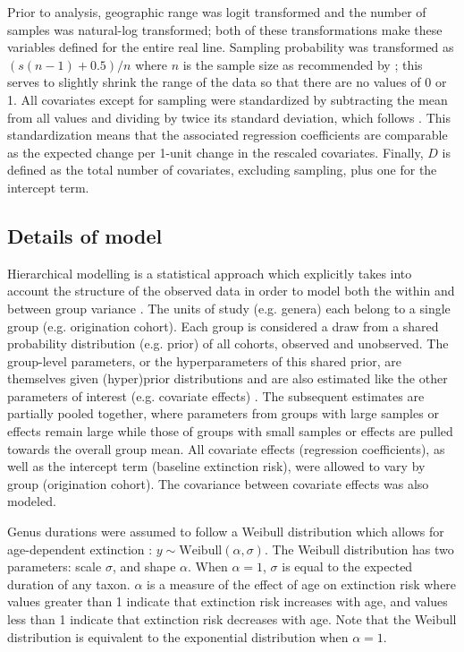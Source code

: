 \documentclass[11pt]{article}
\begin{document}
Prior to analysis, geographic range was logit transformed and the number of samples was natural-log transformed; both of these transformations make these variables defined for the entire real line. Sampling probability was transformed as \((s (n - 1) + 0.5) / n\) where \(n\) is the sample size as recommended by \citet{Smithson2006}; this serves to slightly shrink the range of the data so that there are no values of 0 or 1. All covariates except for sampling were standardized by subtracting the mean from all values and dividing by twice its standard deviation, which follows \citet{Gelman2007}. This standardization means that the associated regression coefficients are comparable as the expected change per 1-unit change in the rescaled covariates. Finally, \(D\) is defined as the total number of covariates, excluding sampling, plus one for the intercept term.



\subsection*{Details of model}

Hierarchical modelling is a statistical approach which explicitly takes into account the structure of the observed data in order to model both the within and between group variance \citep{Gelman2013d,Gelman2007}. The units of study (e.g. genera) each belong to a single group (e.g. origination cohort). Each group is considered a draw from a shared probability distribution (e.g. prior) of all cohorts, observed and unobserved. The group-level parameters, or the hyperparameters of this shared prior, are themselves given (hyper)prior distributions and are also estimated like the other parameters of interest (e.g. covariate effects) \citep{Gelman2013d}. The subsequent estimates are partially pooled together, where parameters from groups with large samples or effects remain large while those of groups with small samples or effects are pulled towards the overall group mean. All covariate effects (regression coefficients), as well as the intercept term (baseline extinction risk), were allowed to vary by group (origination cohort). The covariance between covariate effects was also modeled. 

Genus durations were assumed to follow a Weibull distribution which allows for age-dependent extinction \citep{Klein2003}: \(y \sim \mathrm{Weibull}(\alpha, \sigma)\). The Weibull distribution has two parameters: scale \(\sigma\), and shape \(\alpha\). When \(\alpha = 1\), \(\sigma\) is equal to the expected duration of any taxon. \(\alpha\) is a measure of the effect of age on extinction risk where values greater than 1 indicate that extinction risk increases with age, and values less than 1 indicate that extinction risk decreases with age. Note that the Weibull distribution is equivalent to the exponential distribution when \(\alpha = 1\). 
\end{document}
